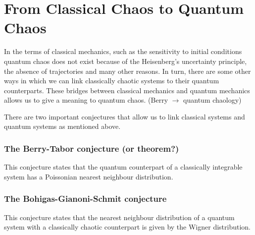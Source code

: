 \documentclass[../thesis.tex]{subfiles}
\theoremstyle{definition}
\begin{document}
\section{From Classical Chaos to Quantum Chaos}

In the terms of classical mechanics, such as the sensitivity to initial conditions
quantum chaos does not exist because of the Heisenberg's uncertainty principle,
the absence of trajectories and many other reasons. In turn, there are some other
ways in which we can link classically chaotic systems to their
quantum counterparts. These bridges between classical mechanics and quantum
mechanics allows us to give a meaning to quantum chaos.
{\color{red} (Berry $\to$ quantum chaology)}

There are two important conjectures that allow us to link classical systems
and quantum systems as mentioned above.

\subsubsection{The Berry-Tabor {\color{red}conjecture (or theorem?)}}

This conjecture states that the quantum counterpart of a classically integrable
system has a Poissonian nearest neighbour distribution.

\subsubsection{The Bohigas-Gianoni-Schmit conjecture}

This conjecture states that the nearest neighbour distribution of a quantum system
with a classically chaotic counterpart is given by the Wigner distribution.
\end{document}
